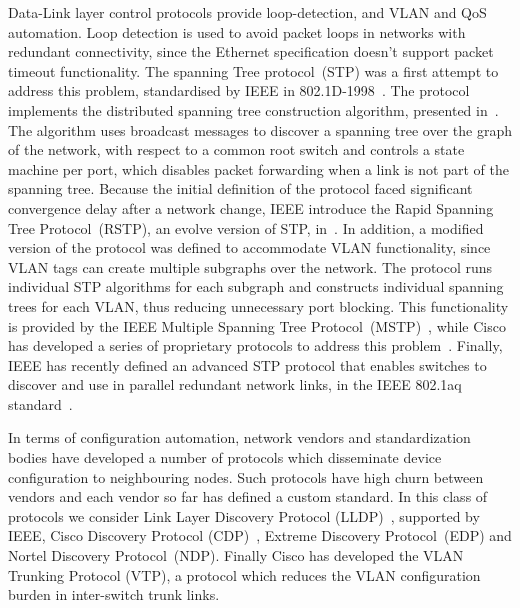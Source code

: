 Data-Link layer control protocols provide loop-detection, and VLAN and QoS
automation. Loop detection is used to avoid packet loops in networks with
redundant connectivity, since the Ethernet specification doesn't support
packet timeout functionality.  The spanning Tree protocol~(STP) was a first attempt to
address this problem, standardised by IEEE in
802.1D-1998~\cite{ieee_802_1d_1998}. The protocol implements the distributed
spanning tree construction algorithm, presented in~\cite{Perlman1985}. The
algorithm uses broadcast messages to discover a spanning tree over the graph of
the network, with respect to a common root switch and controls a state machine
per port, which disables packet forwarding when a link is not part of the
spanning tree.  Because the initial definition of the protocol faced significant
convergence delay after a network change, IEEE introduce the Rapid Spanning Tree
Protocol~(RSTP), an evolve version of STP, in~\cite{ieee_802_1d_2004}.  In
addition, a modified version of the protocol was defined to accommodate VLAN
functionality, since VLAN tags can create multiple subgraphs over the network.
The protocol runs individual STP algorithms for each subgraph and constructs
individual spanning trees for each VLAN, thus reducing unnecessary port
blocking.  This functionality is provided by the IEEE Multiple Spanning Tree
Protocol~(MSTP)~\cite{ieee_802_1q}, while Cisco has developed a series of
proprietary protocols to address this problem~\cite{pvst,pvst+}.  Finally, IEEE
has recently defined an advanced STP protocol that enables switches to discover
and use in parallel redundant network links, in the IEEE 802.1aq
standard~\cite{ieee_802_1aq}.

In terms of configuration automation, network vendors and standardization bodies
have developed a number of protocols which disseminate device configuration to
neighbouring nodes. Such protocols have high churn between vendors and each
vendor so far has defined a custom standard. In this class of protocols we
consider Link Layer Discovery Protocol (LLDP)~\cite{ieee_802_1ab}, supported by
IEEE, Cisco Discovery Protocol (CDP)~\cite{cdp},  Extreme Discovery
Protocol~(EDP) and Nortel Discovery Protocol~(NDP). Finally Cisco has developed
the VLAN Trunking Protocol (VTP), a protocol which reduces the VLAN
configuration burden in inter-switch trunk links.

